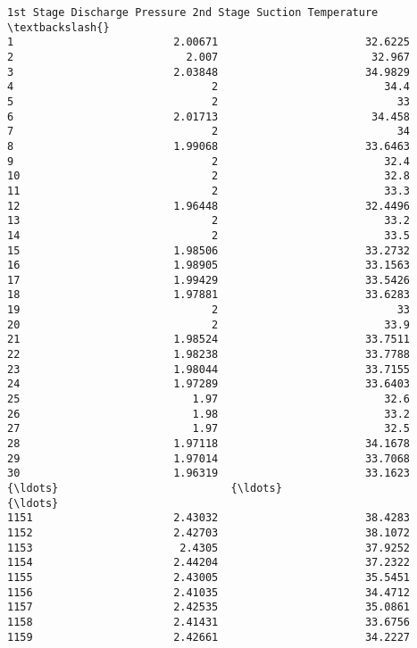\documentclass[11pt]{article}
\begin{document}
\begin{tcolorbox}[breakable, size=fbox, boxrule=.5pt, pad at break*=1mm, opacityfill=0]
\begin{Verbatim}[commandchars=\\\{\}]
     1st Stage Discharge Pressure 2nd Stage Suction Temperature  \textbackslash{}
1                         2.00671                       32.6225
2                           2.007                        32.967
3                         2.03848                       34.9829
4                               2                          34.4
5                               2                            33
6                         2.01713                        34.458
7                               2                            34
8                         1.99068                       33.6463
9                               2                          32.4
10                              2                          32.8
11                              2                          33.3
12                        1.96448                       32.4496
13                              2                          33.2
14                              2                          33.5
15                        1.98506                       33.2732
16                        1.98905                       33.1563
17                        1.99429                       33.5426
18                        1.97881                       33.6283
19                              2                            33
20                              2                          33.9
21                        1.98524                       33.7511
22                        1.98238                       33.7788
23                        1.98044                       33.7155
24                        1.97289                       33.6403
25                           1.97                          32.6
26                           1.98                          33.2
27                           1.97                          32.5
28                        1.97118                       34.1678
29                        1.97014                       33.7068
30                        1.96319                       33.1623
{\ldots}                           {\ldots}                           {\ldots}
1151                      2.43032                       38.4283
1152                      2.42703                       38.1072
1153                       2.4305                       37.9252
1154                      2.44204                       37.2322
1155                      2.43005                       35.5451
1156                      2.41035                       34.4712
1157                      2.42535                       35.0861
1158                      2.41431                       33.6756
1159                      2.42661                       34.2227

\end{Verbatim}
\end{tcolorbox}
\end{document}
